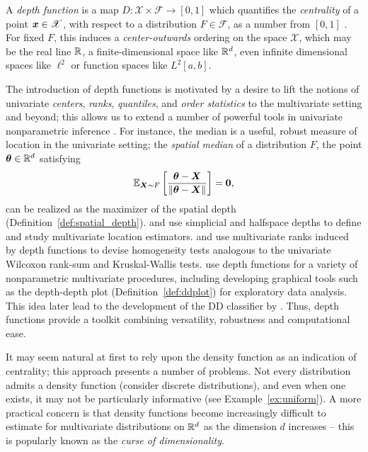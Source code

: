 

A \emph{depth function} is a map $D\colon \mathscr{X} \times \mathscr{F} \to
[0, 1]$ which quantifies the \emph{centrality} of a point $\bm{x} \in
\mathscr{X}$, with respect to a distribution $F \in \mathscr{F}$, as a number
from $[0, 1]$ \parencite{zuo-serfling-2000, mosler-mozharovskyi-2022,
liu-parelius-singh-1999, gijbels-nagy-2017}.
For fixed $F$, this induces a \emph{center-outwards} ordering on the space
$\mathscr{X}$, which may be the real line $\mathbb{R}$, a finite-dimensional space
like $\mathbb{R}^d$, even infinite dimensional spaces like $\ell^2$ or function spaces
like $L^2[a, b]$.


The introduction of depth functions is motivated by a desire to lift the
notions of univariate \emph{centers}, \emph{ranks}, \emph{quantiles},
and \emph{order statistics} to the multivariate setting and beyond; this
allows us to extend a number of powerful tools in univariate nonparametric
inference \parencite{zuo-serfling-2000, mosler-mozharovskyi-2022}.
For instance, the median is a useful, robust measure of location in the
univariate setting; the \emph{spatial median} of a distribution $F$, the point
$\bm{\theta} \in \mathbb{R}^d$ satisfying
\begin{equation}
    \operatorname{\mathbb{E}}_{\bm{X} \sim F}\left[\frac{\bm{\theta} - \bm{X}}{\Vert \bm{\theta} - \bm{X} \Vert}\right] = \bm{0},
\end{equation}
can be realized as the maximizer of the spatial depth
(Definition~\ref{def:spatial_depth}).
\textcite{liu-1990} and \textcite{donoho-gasko-1992} use simplicial and
halfspace depths to define and study multivariate location estimators.
\textcite{liu-singh-1993} and \textcite{chenouri-small-2012} use multivariate
ranks induced by depth functions to devise homogeneity tests analogous to the
univariate Wilcoxon rank-sum and Kruskal-Wallis tests.
\textcite{liu-parelius-singh-1999} use depth functions for a variety of
nonparametric multivariate procedures, including developing graphical tools
such as the depth-depth plot (Definition~\ref{def:ddplot}) for exploratory
data analysis.
This idea later lead to the development of the DD classifier by
\textcite{li-albertos-liu-2012}.
Thus, depth functions provide a toolkit combining versatility, robustness and
computational ease.


It may seem natural at first to rely upon the density function as an
indication of centrality; this approach presents a number of problems.
Not every distribution admits a density function (consider discrete
distributions), and even when one exists, it may not be particularly
informative (see Example~\ref{ex:uniform}).
A more practical concern is that density functions become increasingly
difficult to estimate for multivariate distributions on $\mathbb{R}^d$ as the
dimension $d$ increases -- this is popularly known as the \emph{curse of
dimensionality}.

